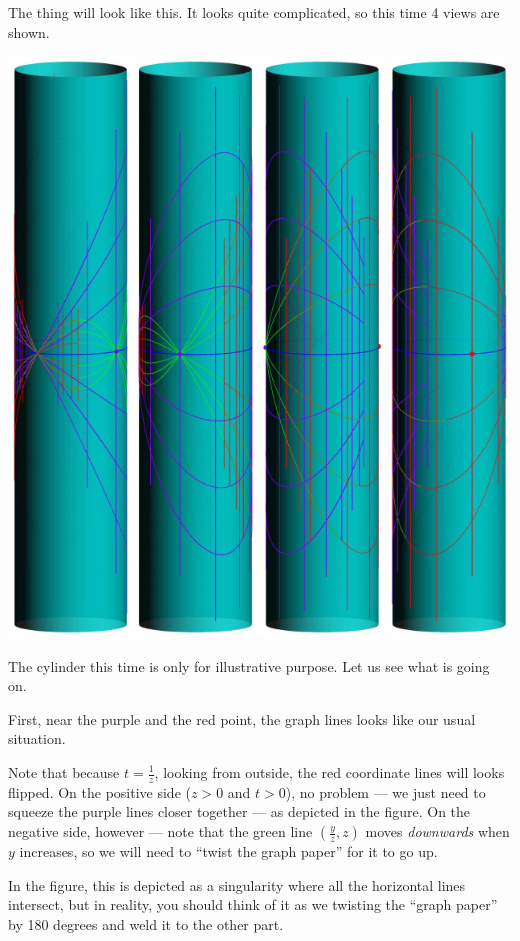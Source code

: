 The thing will look like this. It looks quite complicated, so this time 4 views are shown.
\begin{center}
	\includegraphics{3dfigures/pdf/CxCinf3.pdf}
\end{center}

The cylinder this time is only for illustrative purpose. Let us see what is going on.
\begin{itemize}
	\ii First, near the purple and the red point, the graph lines looks like our usual situation.

	Note that because $t = \frac{1}{z}$, looking from outside, the red coordinate lines will looks
	flipped.
	\ii On the positive side ($z > 0$ and $t > 0$), no problem --- we just need to squeeze the
	purple lines closer together --- as depicted in the figure.
	\ii On the negative side, however --- note that the green line $(\frac{y}{z}, z)$ moves
	\emph{downwards} when $y$ increases, so we will need to ``twist the graph paper'' for it to go
	up.

	In the figure, this is depicted as a singularity where all the horizontal lines intersect, but
	in reality, you should think of it as we twisting the ``graph paper'' by 180 degrees
	and weld it to the other part.
\end{itemize}

